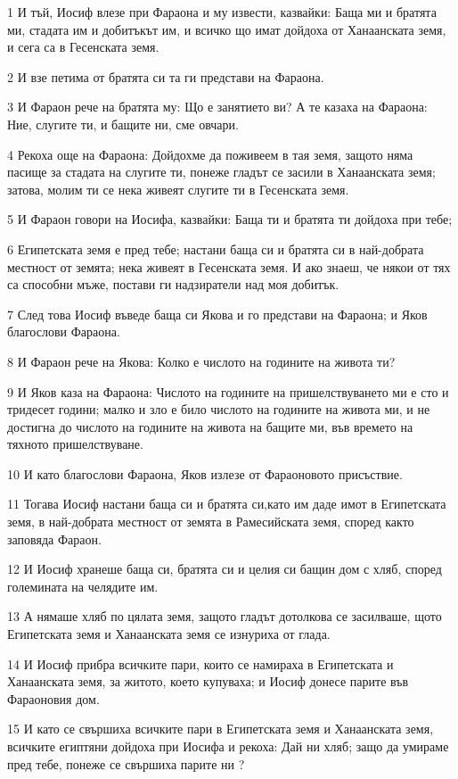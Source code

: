 \par 1 И тъй, Иосиф влезе при Фараона и му извести, казвайки: Баща ми и братята ми, стадата им и добитъкът им, и всичко що имат дойдоха от Ханаанската земя, и сега са в Гесенската земя.
\par 2 И взе петима от братята си та ги представи на Фараона.
\par 3 И Фараон рече на братята му: Що е занятието ви? А те казаха на Фараона: Ние, слугите ти, и бащите ни, сме овчари.
\par 4 Рекоха още на Фараона: Дойдохме да поживеем в тая земя, защото няма пасище за стадата на слугите ти, понеже гладът се засили в Ханаанската земя; затова, молим ти се нека живеят слугите ти в Гесенската земя.
\par 5 И Фараон говори на Иосифа, казвайки: Баща ти и братята ти дойдоха при тебе;
\par 6 Египетската земя е пред тебе; настани баща си и братята си в най-добрата местност от земята; нека живеят в Гесенската земя. И ако знаеш, че някои от тях са способни мъже, постави ги надзиратели над моя добитък.
\par 7 След това Иосиф въведе баща си Якова и го представи на Фараона; и Яков благослови Фараона.
\par 8 И Фараон рече на Якова: Колко е числото на годините на живота ти?
\par 9 И Яков каза на Фараона: Числото на годините на пришелствуването ми е сто и тридесет години; малко и зло е било числото на годините на живота ми, и не достигна до числото на годините на живота на бащите ми, във времето на тяхното пришелствуване.
\par 10 И като благослови Фараона, Яков излезе от Фараоновото присъствие.
\par 11 Тогава Иосиф настани баща си и братята си,като им даде имот в Египетската земя, в най-добрата местност от земята в Рамесийската земя, според както заповяда Фараон.
\par 12 И Иосиф хранеше баща си, братята си и целия си бащин дом с хляб, според големината на челядите им.
\par 13 А нямаше хляб по цялата земя, защото гладът дотолкова се засилваше, щото Египетската земя и Ханаанската земя се изнуриха от глада.
\par 14 И Иосиф прибра всичките пари, които се намираха в Египетската и Ханаанската земя, за житото, което купуваха; и Иосиф донесе парите във Фараоновия дом.
\par 15 И като се свършиха всичките пари в Египетската земя и Ханаанската земя, всичките египтяни дойдоха при Иосифа и рекоха: Дай ни хляб; защо да умираме пред тебе, понеже се свършиха парите ни ?
